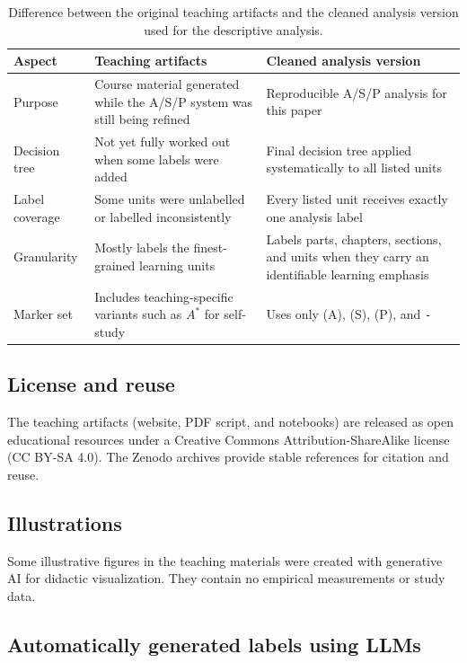 \documentclass{article}
\begin{document}
\begin{table}[hbt!]
  \centering
  \small
  \caption{Difference between the original teaching artifacts and the cleaned analysis version used for the descriptive analysis.}
  \label{tab:teaching-vs-analysis-version}
  \begin{tabularx}{\linewidth}{@{}lXX@{}}
  \toprule
  \textbf{Aspect} & \textbf{Teaching artifacts} & \textbf{Cleaned analysis version} \\
  \midrule
  Purpose & Course material generated while the A/S/P system was still being refined & Reproducible A/S/P analysis for this paper \\
  Decision tree & Not yet fully worked out when some labels were added & Final decision tree applied systematically to all listed units \\
  Label coverage & Some units were unlabelled or labelled inconsistently & Every listed unit receives exactly one analysis label \\
  Granularity & Mostly labels the finest-grained learning units & Labels parts, chapters, sections, and units when they carry an identifiable learning emphasis \\
  Marker set & Includes teaching-specific variants such as \(A^*\) for self-study & Uses only (A), (S), (P), and \texttt{-} \\
  \bottomrule
  \end{tabularx}
\end{table}

\subsection{License and reuse}
The teaching artifacts (website, PDF script, and notebooks) are released as open educational resources under a Creative Commons Attribution-ShareAlike license (CC BY-SA 4.0). The Zenodo archives provide stable references for citation and reuse.\par

\subsection{Illustrations}
Some illustrative figures in the teaching materials were created with generative AI for didactic visualization. They contain no empirical measurements or study data.\par

\subsection{Automatically generated labels using LLMs}
\label{app:llm-comparison}
\end{document}

